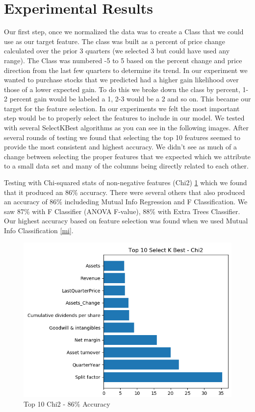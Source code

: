 \documentclass[conference]{IEEEtran}
\begin{document}
\section{Experimental Results}
Our first step, once we normalized the data was to create a Class that we could use as our target feature.  The class was built as a percent of price change calculated over the prior 3 quarters (we selected 3 but could have used any range). The Class was numbered -5 to 5 based on the percent change and price direction from the last few quarters to determine its trend.  In our experiment we wanted to purchase stocks that we predicted had a higher gain likelihood over those of a lower expected gain.  To do this we broke down the class by percent, 1-2 percent gain would be labeled a 1, 2-3 would be a 2 and so on. This became our target for the feature selection.
In our experiments we felt the most important step would be to properly select the features to include in our model. We tested with several SelectKBest algorithms as you can see in the following images. After several rounds of testing we found that selecting the top 10 features seemed to provide the most consistent and highest accuracy.  We didn't see as much of a change between selecting the proper features that we expected which we attribute to a small data set and many of the columns being directly related to each other.  

Testing with Chi-squared stats of non-negative features (Chi2) \ref{chi2} which we found that it produced an 86\% accuracy.  There were several others that also produced an accuracy of 86\% includeding Mutual Info Regression and F Classification. We saw 87\% with F Classifier (ANOVA F-value), 88\% with Extra Trees Classifier. Our highest accuracy based on feature selection was found when we used Mutual Info Classification \ref{mi}.

\begin{figure}
  \includegraphics[width=\linewidth]{Top10Chi2.png}
  \caption{Top 10 Chi2 - 86\% Accuracy}
  \label{chi2}
\end{figure}
\end{document}
